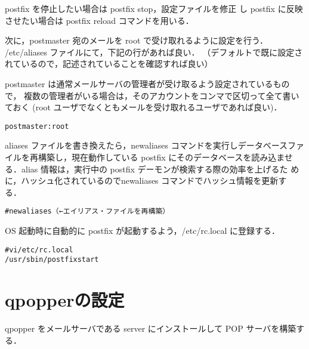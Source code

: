 postfix を停止したい場合は postfix stop，設定ファイルを修正
し postfix に反映させたい場合は postfix reload コマンドを用いる．

次に，postmaster 宛のメールを root で受け取れるように設定を行う．
/etc/aliases ファイルにて，下記の行があれば良い．
（デフォルトで既に設定されているので，記述されていることを確認すれば良い）

postmaster は通常メールサーバの管理者が受け取るよう設定されているもので，
複数の管理者がいる場合は，そのアカウントをコンマで区切って全て書いておく
(root ユーザでなくともメールを受け取れるユーザであれば良い)．

\begin{center}
\begin{breakbox}
\begin{alltt}
postmaster: root
\end{alltt}
\end{breakbox}
\end{center}

aliases ファイルを書き換えたら，newaliases コマンドを実行しデータベースファ
イルを再構築し，現在動作している postfix にそのデータベースを読み込ませ
る．alias 情報は，実行中の postfix デーモンが検索する際の効率を上げるた
めに，ハッシュ化されているのでnewaliases コマンドでハッシュ情報を更新す
る．

\begin{center}
\begin{breakbox}
\begin{alltt}
#newaliases  （←エイリアス・ファイルを再構築）
\end{alltt}
\end{breakbox}
\end{center}

OS 起動時に自動的に postfix が起動するよう，/etc/rc.local に登録する．

\begin{center}
\begin{breakbox}
\begin{alltt}
#vi /etc/rc.local
/usr/sbin/postfix start
\end{alltt}
\end{breakbox}
\end{center}

%
%
\section{qpopperの設定}
qpopper をメールサーバである server にインストールして POP サーバを構築する．

